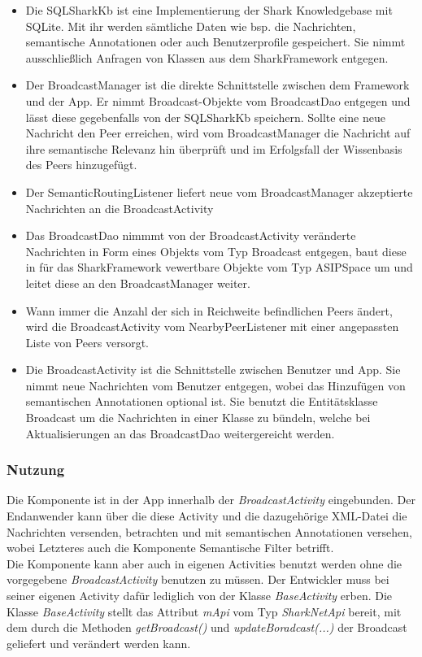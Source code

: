 \begin{itemize}
	\item Die SQLSharkKb ist eine Implementierung der Shark Knowledgebase mit SQLite. Mit ihr werden sämtliche Daten wie bsp. die Nachrichten, semantische Annotationen oder auch Benutzerprofile gespeichert. Sie nimmt ausschließlich Anfragen von Klassen aus dem SharkFramework entgegen.
	\item Der BroadcastManager ist die direkte Schnittstelle zwischen dem Framework und der App. Er nimmt Broadcast-Objekte vom BroadcastDao entgegen und lässt diese gegebenfalls von der SQLSharkKb speichern. Sollte eine neue Nachricht den Peer erreichen, wird vom BroadcastManager die Nachricht auf ihre semantische Relevanz hin überprüft und im Erfolgsfall der Wissenbasis des Peers hinzugefügt.
	\item Der SemanticRoutingListener liefert neue vom BroadcastManager akzeptierte Nachrichten an die BroadcastActivity
	\item Das BroadcastDao nimmmt von der BroadcastActivity veränderte Nachrichten in Form eines Objekts vom Typ Broadcast entgegen, baut diese in für das SharkFramework vewertbare Objekte vom Typ ASIPSpace um und leitet diese an den BroadcastManager weiter.
	\item Wann immer die Anzahl der sich in Reichweite befindlichen Peers ändert, wird die BroadcastActivity vom NearbyPeerListener mit einer angepassten Liste von Peers versorgt.
	\item Die BroadcastActivity ist die Schnittstelle zwischen Benutzer und App. Sie nimmt neue Nachrichten vom Benutzer entgegen, wobei das Hinzufügen von semantischen Annotationen optional ist. Sie benutzt die Entitätsklasse Broadcast um die Nachrichten in einer Klasse zu bündeln, welche bei Aktualisierungen an das BroadcastDao weitergereicht werden. 
\end{itemize}

\label{ch:broadcastinterfaces}


\subsubsection{Nutzung}
Die Komponente ist in der App innerhalb der \textit{BroadcastActivity} eingebunden. Der Endanwender kann über die diese Activity und die dazugehörige XML-Datei die Nachrichten versenden, betrachten und mit semantischen Annotationen versehen, wobei Letzteres auch die Komponente Semantische Filter betrifft.
\\Die Komponente kann aber auch in eigenen Activities benutzt werden ohne die vorgegebene \textit{BroadcastActivity} benutzen zu müssen. Der Entwickler muss bei seiner eigenen Activity dafür lediglich von der Klasse \textit{BaseActivity} erben. Die Klasse \textit{BaseActivity} stellt das Attribut \textit{mApi} vom Typ \textit{SharkNetApi} bereit, mit dem durch die Methoden \textit{getBroadcast()} und \textit{updateBoradcast(...)} der Broadcast geliefert und verändert werden kann.
\\

